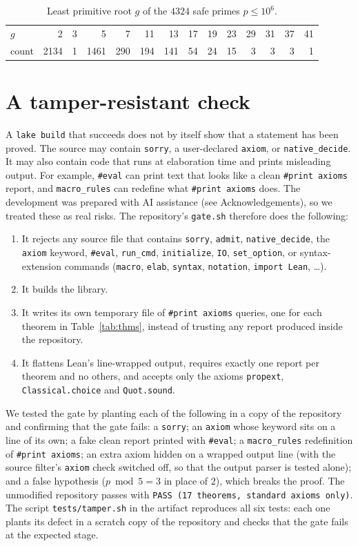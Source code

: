 \documentclass[11pt]{article}
\theoremstyle{remark}
\newcommand{\lean}[1]{\texttt{#1}}
\begin{document}
\begin{table}[h]
\centering\small
\begin{tabular}{@{}l*{13}{r}@{}}
\toprule
$g$ & 2 & 3 & 5 & 7 & 11 & 13 & 17 & 19 & 23 & 29 & 31 & 37 & 41\\
count & 2134 & 1 & 1461 & 290 & 194 & 141 & 54 & 24 & 15 & 3 & 3 & 3 & 1\\
\bottomrule
\end{tabular}
\caption{Least primitive root $g$ of the $4324$ safe primes $p\leq 10^6$.}
\label{tab:dist}
\end{table}

\section{A tamper-resistant check}\label{sec:gate}

A \texttt{lake build} that succeeds does not by itself show that a statement has been proved.
The source may contain \lean{sorry}, a user-declared \lean{axiom}, or \lean{native\_decide}. It
may also contain code that runs at elaboration time and prints misleading output. For example,
\lean{\#eval} can print text that looks like a clean \lean{\#print axioms} report, and
\lean{macro\_rules} can redefine what \lean{\#print axioms} does. The development was prepared with
AI assistance (see Acknowledgements), so we treated these as real risks. The repository's
\texttt{gate.sh} therefore does the following:
\begin{enumerate}
\item It rejects any source file that contains \lean{sorry}, \lean{admit}, \lean{native\_decide},
the \lean{axiom} keyword, \lean{\#eval}, \lean{run\_cmd}, \lean{initialize}, \lean{IO},
\lean{set\_option}, or syntax-extension commands (\lean{macro}, \lean{elab}, \lean{syntax},
\lean{notation}, \lean{import Lean}, \ldots).
\item It builds the library.
\item It writes its own temporary file of \lean{\#print axioms} queries, one for each theorem in
Table~\ref{tab:thms}, instead of trusting any report produced inside the repository.
\item It flattens Lean's line-wrapped output, requires exactly one report per theorem and no
others, and accepts only the axioms \lean{propext}, \lean{Classical.choice} and \lean{Quot.sound}.
\end{enumerate}

We tested the gate by planting each of the following in a copy of the repository and confirming
that the gate fails: a \lean{sorry}; an \lean{axiom} whose keyword sits on a line of its own; a
fake clean report printed with \lean{\#eval}; a \lean{macro\_rules} redefinition of
\lean{\#print axioms}; an extra axiom hidden on a wrapped output line (with the source filter's \lean{axiom} check
switched off, so that the output parser is tested alone); and a false hypothesis
($p\bmod 5=3$ in place of $2$), which breaks the proof. The unmodified repository passes with
\texttt{PASS (17 theorems, standard axioms only)}. The script \texttt{tests/tamper.sh} in the artifact reproduces all six tests: each one plants its
defect in a scratch copy of the repository and checks that the gate fails at the expected stage.
\end{document}
